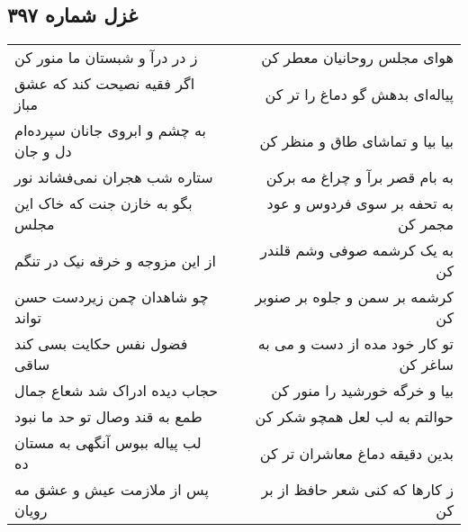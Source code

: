 \begin{center}
\section*{غزل شماره ۳۹۷}
\label{sec:sh397}
\begin{longtable}{l p{0.5cm} r}
ز در درآ و شبستان ما منور کن
&&
هوای مجلس روحانیان معطر کن
\\
اگر فقیه نصیحت کند که عشق مباز
&&
پیاله‌ای بدهش گو دماغ را تر کن
\\
به چشم و ابروی جانان سپرده‌ام دل و جان
&&
بیا بیا و تماشای طاق و منظر کن
\\
ستاره شب هجران نمی‌فشاند نور
&&
به بام قصر برآ و چراغ مه برکن
\\
بگو به خازن جنت که خاک این مجلس
&&
به تحفه بر سوی فردوس و عود مجمر کن
\\
از این مزوجه و خرقه نیک در تنگم
&&
به یک کرشمه صوفی وشم قلندر کن
\\
چو شاهدان چمن زیردست حسن تواند
&&
کرشمه بر سمن و جلوه بر صنوبر کن
\\
فضول نفس حکایت بسی کند ساقی
&&
تو کار خود مده از دست و می به ساغر کن
\\
حجاب دیده ادراک شد شعاع جمال
&&
بیا و خرگه خورشید را منور کن
\\
طمع به قند وصال تو حد ما نبود
&&
حوالتم به لب لعل همچو شکر کن
\\
لب پیاله ببوس آنگهی به مستان ده
&&
بدین دقیقه دماغ معاشران تر کن
\\
پس از ملازمت عیش و عشق مه رویان
&&
ز کارها که کنی شعر حافظ از بر کن
\\
\end{longtable}
\end{center}
